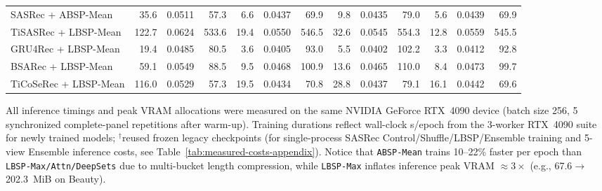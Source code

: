 \begin{table}[!htbp]
\begin{tabular*}{\textwidth}{@{\extracolsep{\fill}}lrrrrrrrrrrrr@{}}
SASRec + ABSP-Mean & 35.6 & 0.0511 & 57.3 & 6.6 & 0.0437 & 69.9 & 9.8 & 0.0435 & 79.0 & 5.6 & 0.0439 & 69.9 \\
TiSASRec + LBSP-Mean & 122.7 & 0.0624 & 533.6 & 19.4 & 0.0550 & 546.5 & 32.6 & 0.0545 & 554.3 & 12.8 & 0.0559 & 545.5 \\
GRU4Rec + LBSP-Mean & 19.4 & 0.0485 & 80.5 & 3.6 & 0.0405 & 93.0 & 5.5 & 0.0402 & 102.2 & 3.3 & 0.0412 & 92.8 \\
BSARec + LBSP-Mean & 59.1 & 0.0549 & 88.5 & 9.5 & 0.0468 & 100.9 & 13.6 & 0.0465 & 110.0 & 8.4 & 0.0473 & 99.7 \\
TiCoSeRec + LBSP-Mean & 116.0 & 0.0529 & 57.3 & 19.5 & 0.0434 & 70.8 & 28.8 & 0.0437 & 79.1 & 16.1 & 0.0442 & 69.6 \\
\bottomrule
\end{tabular*}
\par\smallskip\noindent\begin{minipage}{\textwidth}\fontsize{8}{10}\selectfont All inference timings and peak VRAM allocations were measured on the same NVIDIA GeForce RTX~4090 device (batch size 256, 5 synchronized complete-panel repetitions after warm-up). Training durations reflect wall-clock s/epoch from the 3-worker RTX~4090 suite for newly trained models; $^{\dagger}$reused frozen legacy checkpoints (for single-process SASRec Control/Shuffle/LBSP/Ensemble training and 5-view Ensemble inference costs, see Table~\ref{tab:measured-costs-appendix}). Notice that \texttt{ABSP-Mean} trains 10--22\% faster per epoch than \texttt{LBSP-Max/Attn/DeepSets} due to multi-bucket length compression, while \texttt{LBSP-Max} inflates inference peak VRAM ${\approx}3\times$ (e.g., 67.6$\to$202.3~MiB on Beauty).
\end{minipage}
\end{table}
